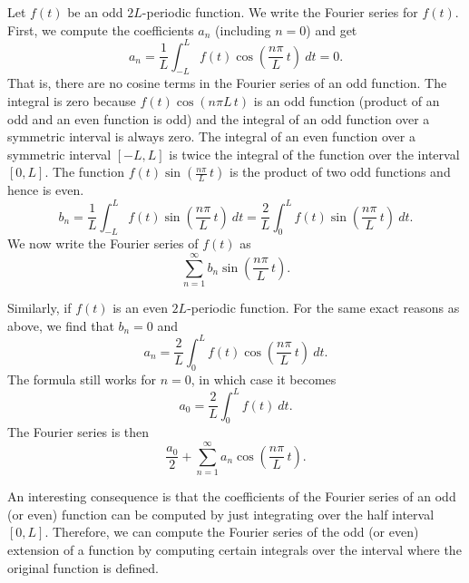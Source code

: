 \documentclass[12pt]{book}
\begin{document}
Let $f(t)$ be an odd $2L$-periodic function.  We write 
the Fourier series for $f(t)$.  First, we compute the coefficients $a_n$ (including
$n=0$) and get
\begin{equation*}
a_n = \frac{1}{L} \int_{-L}^L f(t) \cos \left( \frac{n \pi}{L} \, t \right)
~ dt = 0 .
\end{equation*}
That is, there are no cosine terms in the Fourier series of an odd function.
The integral is zero
because $f(t) \cos \left( {n \pi}{L} \,t \right)$
is an odd function (product of an odd and an
even function is odd) and the integral of an odd function over a symmetric
interval is always zero.
The integral of an even function over a symmetric interval
$[-L,L]$ is twice the integral of the function over the interval $[0,L]$.
The function $f(t) \sin \left( \frac{n \pi}{L} \, t \right)$ is the product of two odd
functions and hence is even.
\begin{equation*}
b_n = 
\frac{1}{L} \int_{-L}^L f(t) \sin \left( \frac{n \pi}{L} \, t \right) ~ dt =
\frac{2}{L} \int_{0}^L f(t) \sin \left( \frac{n \pi}{L} \, t \right) ~ dt .
\end{equation*}
We now write the Fourier series of $f(t)$ as
\begin{equation*}
\sum_{n=1}^\infty b_n \sin \left( \frac{n \pi}{L} \, t \right) .
\end{equation*}

Similarly, if $f(t)$ is an even $2L$-periodic function.  For the same exact
reasons as above, we find that $b_n = 0$ and
\begin{equation*}
a_n = 
\frac{2}{L} \int_{0}^L f(t) \cos \left( \frac{n \pi}{L} \, t \right) ~ dt .
\end{equation*}
The formula still works for $n=0$, in which case it becomes
\begin{equation*}
a_0 = 
\frac{2}{L} \int_{0}^L f(t) ~ dt .
\end{equation*}
The Fourier series is then
\begin{equation*}
\frac{a_0}{2}
+
\sum_{n=1}^\infty a_n \cos \left( \frac{n \pi}{L} \, t \right) .
\end{equation*}

An interesting consequence is that the coefficients of the Fourier series of
an odd (or even) function can be computed by just integrating over the half
interval $[0,L]$.  Therefore, we can compute the Fourier series of
the odd (or even) extension of a
function by computing certain integrals over the interval
where the original function is defined.
\end{document}
